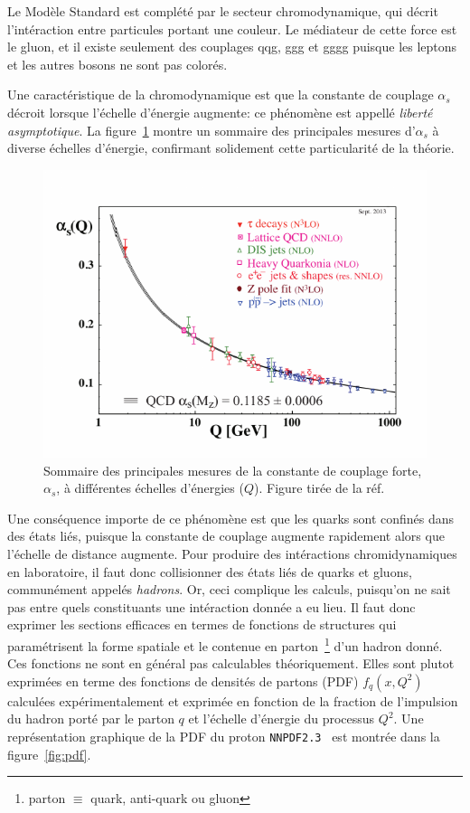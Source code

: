 Le Modèle Standard est complété par le secteur chromodynamique, qui
décrit l'intéraction entre particules portant une couleur. Le
médiateur de cette force est le gluon, et il existe seulement des couplages
qqg, ggg et gggg puisque les leptons et les autres
bosons ne sont pas colorés. 

Une caractéristique de la chromodynamique est que la constante de
couplage $\alpha_s$ décroit lorsque l'échelle d'énergie augmente: ce
phénomène est appellé \emph{liberté asymptotique}. La
figure~\ref{fig:alpha_s} montre un sommaire des principales mesures
d'$\alpha_s$ à diverse échelles d'énergie, confirmant solidement cette
particularité de la théorie. 

\begin{figure}
  \centering
  \includegraphics{alpha_s.pdf}
  \caption{Sommaire des principales mesures de la constante de couplage forte, $\alpha_s$, à différentes échelles d'énergies ($Q$). Figure tirée de la réf. \cite{olive_review_2014}}
\label{fig:alpha_s}
\end{figure}

Une conséquence importe de ce phénomène est que les quarks sont
confinés dans des états liés, puisque la constante de couplage
augmente rapidement alors que l'échelle de distance augmente. Pour
produire des intéractions chromidynamiques en laboratoire, il faut
donc collisionner des états liés de quarks et gluons, communément
appelés \emph{hadrons}. Or, ceci complique les calculs, puisqu'on ne
sait pas entre quels constituants une intéraction donnée a eu lieu. Il
faut donc exprimer les sections efficaces en termes de fonctions de
structures qui paramétrisent la forme spatiale et le contenue en
parton~\footnote{parton $\equiv$ quark, anti-quark ou gluon} d'un
hadron donné. Ces fonctions ne sont en général pas calculables
théoriquement. Elles sont plutot exprimées en terme des fonctions de
densités de partons (PDF) $f_q(x,Q^2)$ calculées expérimentalement et
exprimée en fonction de la fraction de l'impulsion du hadron porté par
le parton $q$ et l'échelle d'énergie du processus $Q^2$. Une
représentation graphique de la PDF du proton
\texttt{NNPDF2.3}~\cite{ball_parton_2013} est montrée dans la
figure~\ref{fig:pdf}.

